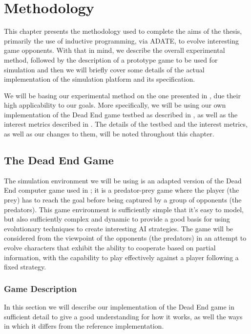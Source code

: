 \cleardoublepage
\chapter{Methodology}
\label{methodology}

This chapter presents the methodology used to complete the aims of the thesis,
primarily the use of inductive programming, via ADATE, to evolve interesting
game opponents. With that in mind, we describe the overall experimental method,
followed by the description of a prototype game to be used for simulation and
then we will briefly cover some details of the actual implementation of the
simulation platform and its specification.

We will be basing our experimental method on the one presented in
\citet{yannakakis2005ai}, due their high applicability to our goals. More
specifically, we will be using our own implementation of the Dead End game
testbed as described in \citet[Chap.~5]{yannakakis2005ai}, as well as the
interest metrics described in \citet[Chap.~2]{yannakakis2005ai}. The details of
the testbed and the interest metrics, as well as our changes to them, will be
noted throughout this chapter.

\section{The Dead End Game}
\label{sec:game}

The simulation environment we will be using is an adapted version of the Dead
End computer game used in \citet{yannakakis2005ai}; it is a predator-prey game
where the player (the prey) has to reach the goal before being captured by a
group of opponents (the predators). This game environment is sufficiently simple
that it's easy to model, but also sufficiently complex and dynamic to provide a
good basis for using evolutionary techniques to create interesting AI
strategies. The game will be considered from the viewpoint of the opponents (the
predators) in an attempt to evolve characters that exhibit the ability to
cooperate based on partial information, with the capability to play effectively
against a player following a fixed strategy.

\subsection{Game Description}
\label{sec:game-description}

In this section we will describe our implementation of the Dead End game in
sufficient detail to give a good understanding for how it works, as well the
ways in which it differs from the reference implementation.
\citep[see][Chap.~5]{yannakakis2005ai}

